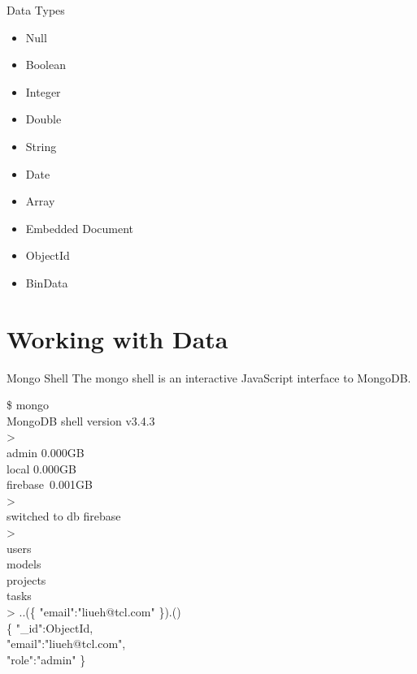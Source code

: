 \documentclass{beamer}
\begin{document}
\begin{frame}{Data Types}
    \begin{itemize}
        \item Null
        \item Boolean
        \item Integer
        \item Double
        \item String
        \item Date
        \item Array
        \item Embedded Document
        \item ObjectId
        \item BinData
    \end{itemize}
\end{frame}

\section{Working with Data}
\begin{frame}{Mongo Shell}
    The mongo shell is an interactive JavaScript interface to MongoDB. 
    \begin{minipage}[t]{0.5\textwidth}
    	\scriptsize
    	\begin{Alms*}
    		\$ mongo \\
    		MongoDB shell version v3.4.3 \\
    		>   \\
    		admin \qquad 0.000GB\\
    		local \qquad 0.000GB\\
    		firebase \,0.001GB\\
    		>   \\
    		switched to db firebase \\
    		>   \\
    		users \\
    		models \\
    		projects \\
    		tasks \\
    		> ..(\{
    		 \NI
    		"email":"liueh@tcl.com"
    		\ND \}).() \\
    		\{ \NI
    		"\_id":ObjectId, \\
    		"email":"liueh@tcl.com", \\
    		"role":"admin"
    		\ND \}
    	\end{Alms*}
    \end{minipage}
\end{frame}
\end{document}
